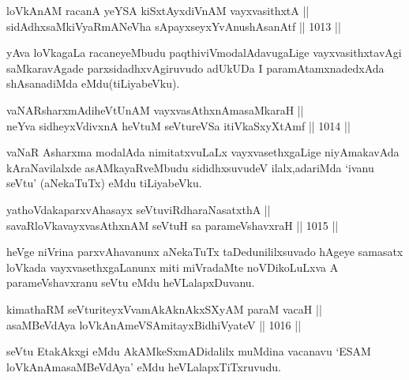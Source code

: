 
\begin{shl}
loVkAnAM racanA yeYSA kiSxtAyxdiVnAM vayxvasithxtA || \\
sidAdhx\s saMkiVyaRmANeVha sA\s payxseyxYvAnushAsanAtf \hfill || 1013 ||  
\end{shl}

\begin{artha}
yAva loVkagaLa racaneyeMbudu paqthiviVmodalAdavugaLige vayxvasithxtavAgi saMkaravAgade parxsidadhxvAgiruvudo adUkUDa I paramAtamxnadedxAda shAsanadiMda eMdu(tiLiyabeVku).
\end{artha}


\begin{shl}
vaNARsharxmAdiheVtUnAM vayxvasAthxnAmasaMkaraH || \\
neYva sidheyxVdivxnA heVtuM seVtureVSa itiVkaSxyXtAmf \hfill || 1014 ||  
\end{shl}

\begin{artha}
vaNaR Asharxma modalAda nimitatxvuLaLx vayxvasethxgaLige niyAmakavAda kAraNavilalxde asAMkayaRveMbudu sididhxsuvudeV ilalx,\break adariMda `ivanu seVtu' (aNekaTuTx) eMdu tiLiyabeVku.
\end{artha}


\begin{shl}
yathoVdakaparxvAhasayx seVtuviRdharaNasatxthA || \\
savaRloVkavayxvasAthxnAM seVtuH sa parameVshavxraH \hfill || 1015 ||  
\end{shl}

\begin{artha}
heVge niVrina parxvAhavanunx aNekaTuTx taDedunililxsuvado hAgeye samasatx loVkada vayxvasethxgaLanunx miti miVradaMte noVDikoLuLxva A parameVshavxranu seVtu eMdu heVLalapxDuvanu.
\end{artha}

\begin{shl}
kimathaRM seVturiteyxVvamAkAknAkxSXyAM paraM vacaH || \\
asaMBeVdAya loVkAnAmeVSAmitayxBidhiVyateV \hfill || 1016 ||  
\end{shl}

\begin{artha}
seVtu EtakAkxgi eMdu AkAMkeSxmADidalilx muMdina vacanavu `ESAM loVkAnAmasaMBeVdAya' eMdu heVLalapxTiTxruvudu.
\end{artha}

